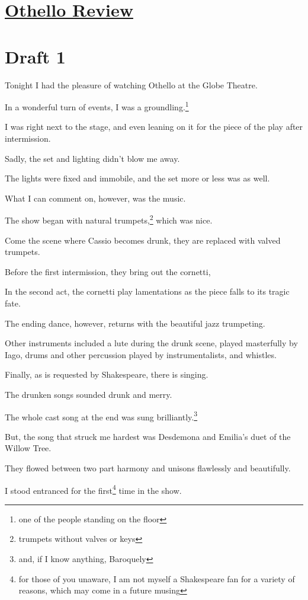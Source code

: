 \documentclass[12pt]{article}[titlepage]
\newcommand{\1}{\={a}}
\newcommand{\2}{\={e}}
\newcommand{\3}{\={\i}}
\newcommand{\4}{\=o}
\newcommand{\5}{\=u}
\newcommand{\6}{\={A}}
\renewcommand{\,}{\textsuperscript{,}}
\begin{document}
\doublespacing

\section{\href{othello.html}{Othello Review}}

\section{Draft 1}

Tonight I had the pleasure of watching Othello at the Globe Theatre.

In a wonderful turn of events, I was a groundling.\footnote{one of the people standing on the floor}

I was right next to the stage, and even leaning on it for the piece of the play after intermission.


Sadly, the set and lighting didn’t blow me away.

The lights were fixed and immobile, and the set more or less was as well.

What I can comment on, however, was the music.


The show began with natural trumpets,\footnote{trumpets without valves or keys} which was nice.

Come the scene where Cassio becomes drunk, they are replaced with valved trumpets.

Before the first intermission, they bring out the cornetti,


In the second act, the cornetti play lamentations as the piece falls to its tragic fate.

The ending dance, however, returns with the beautiful jazz trumpeting.

Other instruments included a lute during the drunk scene, played masterfully by Iago, drums and other percussion played by instrumentalists, and whistles.


Finally, as is requested by Shakespeare, there is singing.

The drunken songs sounded drunk and merry.

The whole cast song at the end was sung brilliantly.\footnote{and, if I know anything, Baroquely}

But, the song that struck me hardest was Desdemona and Emilia’s duet of the Willow Tree.

They flowed between two part harmony and unisons flawlessly and beautifully.

I stood entranced for the first\footnote{for those of you unaware, I am not myself a Shakespeare fan for a variety of reasons, which may come in a future musing} time in the show.
\end{document}
